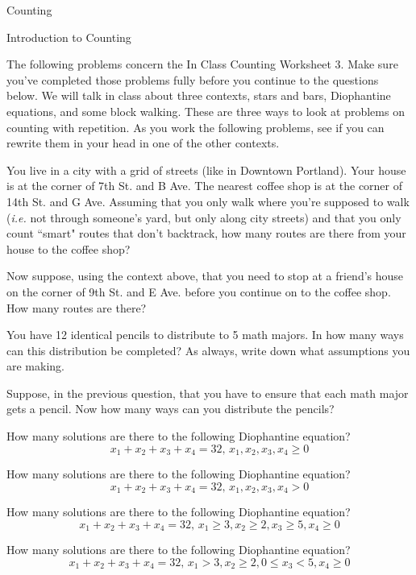 \begin{chapter}{Counting}
\begin{section}{Introduction to Counting}
\begin{problem}
\end{problem}
The following problems concern the In Class Counting Worksheet 3. Make sure you've completed those problems fully before you continue to the questions below. We will talk in class about three contexts, stars and bars, Diophantine equations, and some block walking. These are three ways to look at problems on counting with repetition. As you work the following problems, see if you can rewrite them in your head in one of the other contexts.
\begin{exercise}
You live in a city with a grid of streets (like in Downtown Portland). Your house is at the corner of 7th St. and B Ave. The nearest coffee shop is at the corner of 14th St. and G Ave. Assuming that you only walk where you're supposed to walk (\emph{i.e.} not through someone's yard, but only along city streets) and that you only count ``smart" routes that don't backtrack, how many routes are there from your house to the coffee shop?
\end{exercise}
\begin{exercise}
Now suppose, using the context above, that you need to stop at a friend's house on the corner of 9th St. and E Ave. before you continue on to the coffee shop. How many routes are there?
\end{exercise}
\begin{exercise}
You have 12 identical pencils to distribute to 5 math majors. In how many ways can this distribution be completed? As always, write down what assumptions you are making.
\end{exercise}
\begin{exercise}
Suppose, in the previous question, that you have to ensure that each math major gets a pencil. Now how many ways can you distribute the pencils?
\end{exercise}
\begin{exercise}
How many solutions are there to the following Diophantine equation?
\[
x_1+x_2+x_3+x_4 = 32,  \, x_1, x_2, x_3, x_4 \geq 0
\]
\end{exercise}
\begin{exercise}
How many solutions are there to the following Diophantine equation?
\[
x_1+x_2+x_3+x_4 = 32,  \, x_1, x_2, x_3, x_4 > 0
\]
\end{exercise}
\begin{exercise}
How many solutions are there to the following Diophantine equation?
\[
x_1+x_2+x_3+x_4 = 32,  \, x_1 \geq 3, x_2 \geq 2,  x_3 \geq 5, x_4 \geq 0
\]
\end{exercise}
\begin{exercise}
How many solutions are there to the following Diophantine equation?
\[
x_1+x_2+x_3+x_4 = 32,  \, x_1 >3, x_2 \geq 2, 0 \leq x_3<5, x_4 \geq 0
\]
\end{exercise}


\end{section}
\end{chapter}
